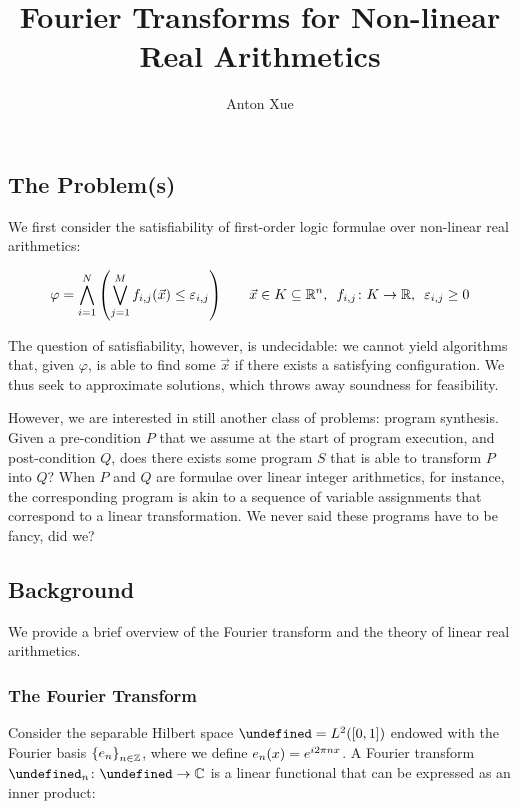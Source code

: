 \documentclass[12pt]{article}
\title{Fourier Transforms for Non-linear Real Arithmetics}
\author{Anton Xue}
\date{}
\let\H\undefined
\newcommand{\H}{\mathcal{H}}
\let\F\undefined
\newcommand{\F}{\mathcal{F}}
\begin{document}
\maketitle

\subsection{The Problem(s)}
We first consider the satisfiability of first-order logic formulae over
non-linear real arithmetics:

\begin{align*}
  \varphi
    = \bigwedge_{i = 1}^{N} {\left(\bigvee_{j = 1}^{M}
        f_{i, j}{\left(\vec{x}\right)} \leq \varepsilon_{i, j}\right)}
  \qquad
  \vec{x} \in K \subseteq {\mathbb{R}}^n, \enskip
  {f_{i, j} \colon K \to {\mathbb{R}}}, \enskip
  \varepsilon_{i, j} \geq 0
\end{align*}

The question of satisfiability, however, is undecidable:
we cannot yield algorithms that, given $\varphi$, is able to find some
$\vec{x}$ if there exists a satisfying configuration.
We thus seek to approximate solutions, which throws away soundness for
feasibility.

However, we are interested in still another class of problems:
program synthesis.
Given a pre-condition $P$ that we assume at the start of program execution,
and post-condition $Q$, does there exists some program $S$ that is able to
transform $P$ into $Q$?
When $P$ and $Q$ are formulae over linear integer arithmetics, for instance,
the corresponding program is akin to a sequence of variable assignments
that correspond to a linear transformation.
We never said these programs have to be fancy, did we?


\subsection{Background}
We provide a brief overview of the Fourier transform and the theory of linear
real arithmetics.

\subsubsection{The Fourier Transform}
Consider the separable Hilbert space $\H = L^2 \parens{\brackets{0, 1}}$
endowed with the Fourier basis ${\left\{e_n\right\}}_{n \in {\mathbb{Z}}}$, where we define
$e_n {\left(x\right)} = e^{i 2\pi n x}$.
A Fourier transform $\type{\F_n}{\H}{\C}$ is a linear functional that can
be expressed as an inner product:
\end{document}
